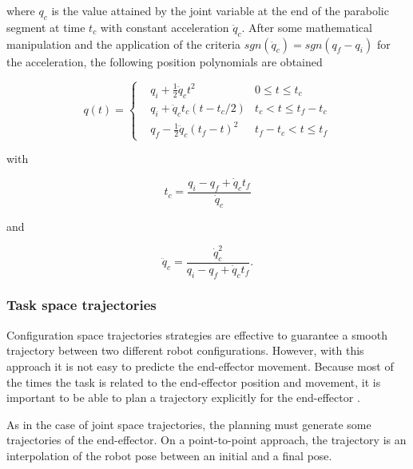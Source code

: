 where $q_c$ is the value attained by the joint variable at the end of the parabolic segment at time $t_c$ with constant acceleration $\ddot{q}_c$. After some mathematical manipulation and the application of the criteria $sgn (\ddot{q}_c) = sgn (q_f - q_i)$ for the acceleration, the following position polynomials are obtained \cite{Siciliano2009_robotics_modelling_planning_control}

\begin{equation}
    q(t) = \left\{ 
    \begin{aligned}
    & q_i + \frac{1}{2} \ddot{q}_c t^2 & 0 \leq t \leq t_c\\
    & q_i + \ddot{q}_c t_c(t - t_c / 2) & t_c < t \leq t_f - t_c\\
    & q_f - \frac{1}{2} \ddot{q}_c(t_f - t)^2 & t_f - t_c < t \leq t_f 
    \end{aligned}
    \right.
\end{equation}

with

\begin{equation}
    t_c = \frac{q_i - q_f + \dot{q}_c t_f}{\dot{q}_c}
\end{equation}

and

\begin{equation}
    \ddot{q}_c = \frac{\dot{q}_c^2}{q_i - q_f + \dot{q}_c t_f} .
\end{equation}


\subsubsection{Task space trajectories}
\label{subsubsec:task_space_trajectories}

Configuration space trajectories strategies are effective to guarantee a smooth trajectory between two different robot configurations. However, with this approach it is not easy to predicte the end-effector movement. Because most of the times the task is related to the end-effector position and movement, it is important to be able to plan a trajectory explicitly for the end-effector \cite{Siciliano2009_robotics_modelling_planning_control}.

As in the case of joint space trajectories, the planning must generate some trajectories of the end-effector. On a point-to-point approach, the trajectory is an interpolation of the robot pose between an initial and a final pose.

